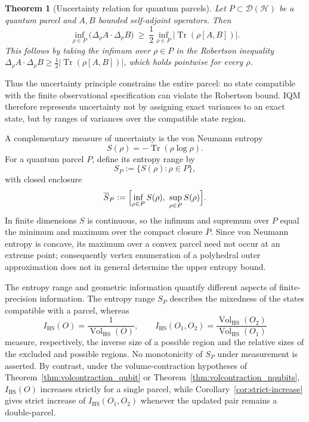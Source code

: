 \documentclass[11pt, onecolumn]{article}
\newtheorem{theorem}{Theorem}
\begin{document}
\begin{theorem}[Uncertainty relation for quantum parcels]
\label{thm:uncertainty}
Let $P\subset\mathcal D(\mathcal H)$ be a quantum parcel and $A,B$ bounded self-adjoint operators. Then
\[
\inf_{\rho\in P}\bigl(\Delta_\rho A\cdot\Delta_\rho B\bigr)
\ \ge\
\frac12\inf_{\rho\in P}\bigl|\operatorname{Tr}(\rho[A,B])\bigr|.
\]
This follows by taking the infimum over $\rho\in P$ in the Robertson inequality $\Delta_\rho A\cdot\Delta_\rho B\ge\frac12|\operatorname{Tr}(\rho[A,B])|$, which holds pointwise for every $\rho$.
\end{theorem}

Thus the uncertainty principle constrains the entire parcel: no state compatible with the finite observational specification can violate the Robertson bound. IQM therefore represents uncertainty not by assigning exact variances to an exact state, but by ranges of variances over the compatible state region.


A complementary measure of uncertainty is the von Neumann entropy
\[
S(\rho) = -\operatorname{Tr}(\rho\log\rho).
\]
For a quantum parcel $P$, define its entropy range by
\[
S_P := \{S(\rho):\rho\in P\},
\]
with closed enclosure
\[
\overline S_P := \Bigl[\inf_{\rho\in P}S(\rho),\ \sup_{\rho\in P}S(\rho)\Bigr].
\]
In finite dimensions $S$ is continuous, so the infimum and supremum over $P$ equal the minimum and maximum over the compact closure $\overline P$. Since von Neumann entropy is concave, its maximum over a convex parcel need not occur at an extreme point; consequently vertex enumeration of a polyhedral outer approximation does not in general determine the upper entropy bound.

The entropy range and geometric information quantify different aspects of
finite-precision information. The entropy range $S_P$ describes the
mixedness of the states compatible with a parcel, whereas
\[
I_{\mathrm{HS}}(O)
=
\frac{1}{\operatorname{Vol}_{\mathrm{HS}}(O)},
\qquad
I_{\mathrm{HS}}(O_1,O_2)
=
\frac{\operatorname{Vol}_{\mathrm{HS}}(O_2)}
     {\operatorname{Vol}_{\mathrm{HS}}(O_1)}
\]
measure, respectively, the inverse size of a possible region and the
relative sizes of the excluded and possible regions. No monotonicity of
$S_P$ under measurement is asserted. By contrast, under the
volume-contraction hypotheses of Theorem~\ref{thm:volcontraction_qubit}
or Theorem~\ref{thm:volcontraction_nqubits},
$I_{\mathrm{HS}}(O)$ increases strictly for a single parcel, while
Corollary~\ref{cor:strict-increase} gives strict increase of
$I_{\mathrm{HS}}(O_1,O_2)$ whenever the updated pair remains a
double-parcel.
\end{document}
